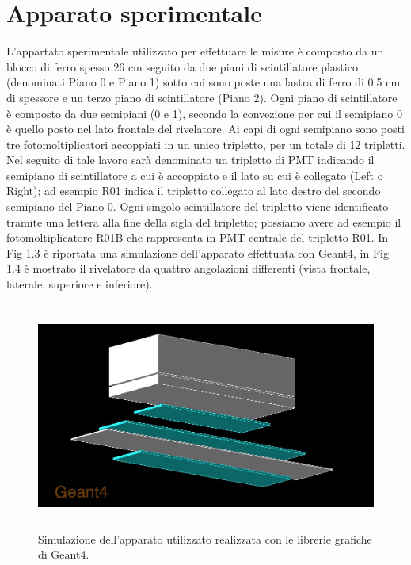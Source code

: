 \documentclass{standalone}
\begin{document}
\section{Apparato sperimentale}
L'appartato sperimentale utilizzato per effettuare le misure \`e composto da un blocco di ferro spesso 26 cm seguito da due piani di scintillatore plastico (denominati Piano 0 e Piano 1) sotto cui sono poste una lastra di ferro di 0.5 cm di spessore e un terzo piano di scintillatore (Piano 2).
Ogni piano di scintillatore \`e composto da due semipiani (0 e 1), secondo la convezione per cui il semipiano 0 \`e quello posto nel lato frontale del rivelatore. Ai capi di ogni semipiano sono posti tre fotomoltiplicatori accoppiati in un unico tripletto, per un totale di 12 tripletti. Nel seguito di tale lavoro sar\`a denominato un tripletto di PMT indicando il semipiano di scintillatore a cui \`e accoppiato e il lato su cui \`e collegato (Left o Right); ad esempio R01 indica il tripletto collegato al lato destro del secondo semipiano del Piano 0. Ogni singolo scintillatore del tripletto viene identificato tramite una lettera alla fine della sigla del tripletto; possiamo avere ad esempio il fotomoltiplicatore R01B che rappresenta in PMT centrale del tripletto R01.
In Fig 1.3 \`e riportata una simulazione dell'apparato effettuata con Geant4, in Fig 1.4 \`e mostrato il rivelatore da quattro angolazioni differenti (vista frontale, laterale, superiore e inferiore).

\begin{figure}[H]
	\centering
  \includegraphics[width=12cm, height=7.5cm]{images/general.jpg}
  \caption{Simulazione dell'apparato utilizzato realizzata con le librerie grafiche di Geant4.}
\end{figure}
\end{document}
